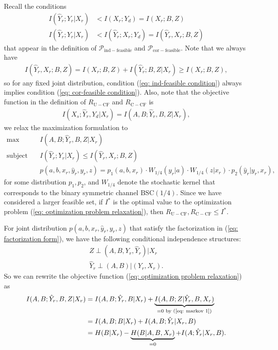 \documentclass[12pt]{article}
\theoremstyle{definition}
\begin{document}
Recall the conditions
\begin{align}
    I(\hat{Y}_r; Y_r | X_r) & < I(X_r; Y_d) = I(X_r; B, Z) \label{eq: ind-feasible condition} \\
    I(\hat{Y}_r; Y_r | X_r) & < I(\hat{Y}_r; X_r; Y_d) = I(\hat{Y}_r, X_r; B, Z) \label{eq: cor-feasible condition}
\end{align}
that appear in the definition of $\mathcal P_{\mathrm{ind-feasible}}$ and $\mathcal P_{\mathrm{cor-feasible}}$. Note that we always have
\begin{align*}
    I(\hat{Y}_r, X_r; B,Z) = I(X_r; B, Z) + I(\hat{Y}_r; B, Z | X_r) \geq I(X_r; B, Z),
\end{align*}
so for any fixed joint distribution, condition (\ref{eq: ind-feasible condition}) always implies condition (\ref{eq: cor-feasible condition}). Also, note that the objective function in the definition of $R_{\mathrm{U-CF}}$ and $R_{\mathrm{C-CF}}$ is 
\begin{align*}
    I(X_s; \hat{Y}_r, Y_d | X_r) = I(A, B; \hat{Y}_r, B, Z | X_r),
\end{align*}
we relax the maximization formulation to
\begin{align}
    \max \quad & I(A, B; \hat{Y}_r, B, Z | X_r) \label{eq: optimization problem relaxation} \\ 
    \text{subject to} \quad & I(\hat{Y}_r ; Y_r | X_r) \leq I(\hat{Y}_r, X_r; B, Z) \label{eq: optimization constraint} \\
    & p(a,b,x_r, \hat{y}_r, y_r, z) = p_1(a,b, x_r) \cdot W_{1/4}(y_r|a) \cdot W_{1/4}(z|x_r) \cdot p_2(\hat{y}_r| y_r, x_r), \label{eq: factorization form}
\end{align}
for some distribution $p_1, p_2$, and $W_{1/4}$ denote the stochastic kernel that corresponds to the binary symmetric channel $\mathrm{BSC}(1/4)$. Since we have considered a larger feasible set, if $I^*$ is the optimal value to the optimization problem (\ref{eq: optimization problem relaxation}), then $R_{\mathrm{U-CF}}, R_{\mathrm{C-CF}} \leq I^*$.

For joint distribution $p(a,b,x_r,\hat{y}_r, y_r, z)$ that satisfy the factorization in (\ref{eq: factorization form}), we have the following conditional independence structures:
\begin{align}
    Z \perp (A, B, Y_r, \hat{Y}_r) | X_r \label{eq: markov 1} \\
    \hat{Y}_r \perp (A,B) |(Y_r , X_r) \label{eq: markov 2}.
\end{align}
So we can rewrite the objective function (\ref{eq: optimization problem relaxation}) as 
\begin{align}
    I(A, B; \hat{Y}_r, B, Z| X_r) &= I(A, B; \hat{Y}_r, B | X_r) + \underbrace{I(A, B;Z|\hat{Y}_r, B, X_r)}_{=0 \text{ by (\ref{eq: markov 1})}} \nonumber \\
    & = I(A, B; B | X_r) + I(A, B; \hat{Y}_r | X_r, B) \nonumber \\
    & = H(B|X_r) - \underbrace{H(B|A,B,X_r)}_{=0} + I(A; \hat{Y}_r | X_r, B). \label{eq: rewrite objective function}
\end{align}
\end{document}
